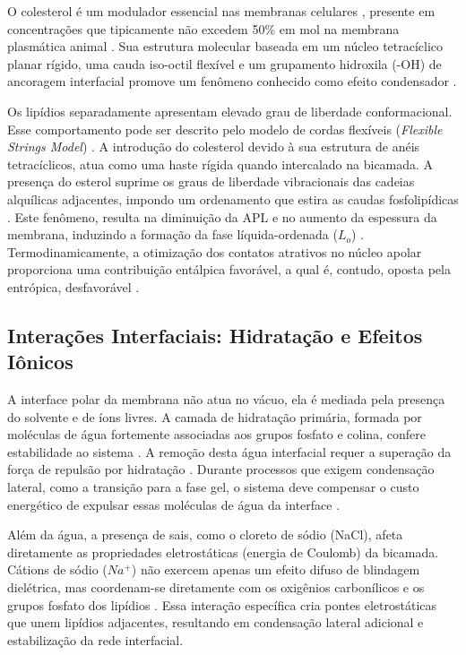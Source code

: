 O colesterol é um modulador essencial nas membranas celulares \cite{paukner2022}, presente em concentrações que tipicamente não excedem 50\% em mol na membrana plasmática animal \cite{khadka2021}. Sua estrutura molecular baseada em um núcleo tetracíclico planar rígido, uma cauda iso-octil flexível e um grupamento hidroxila (-OH) de ancoragem interfacial promove um fenômeno conhecido como efeito condensador \cite{sawdon2025}.

Os lipídios separadamente apresentam elevado grau de liberdade conformacional. Esse comportamento pode ser descrito pelo modelo de cordas flexíveis (\textit{Flexible Strings Model}) \cite{mukhin2016flexible}. A introdução do colesterol devido à sua estrutura de anéis tetracíclicos, atua como uma haste rígida quando intercalado na bicamada. A presença do esterol suprime os graus de liberdade vibracionais das cadeias alquílicas adjacentes, impondo um ordenamento que estira as caudas fosfolipídicas \cite{bennett2018}. Este fenômeno, resulta na diminuição da APL e no aumento da espessura da membrana, induzindo a formação da fase líquida-ordenada ($L_o$) \cite{leeb2018}. Termodinamicamente, a otimização dos contatos atrativos no núcleo apolar proporciona uma contribuição entálpica favorável, a qual é, contudo, oposta pela entrópica, desfavorável \cite{bennett2018}.

\subsection{Interações Interfaciais: Hidratação e Efeitos Iônicos}

A interface polar da membrana não atua no vácuo, ela é mediada pela presença do solvente e de íons livres. A camada de hidratação primária, formada por moléculas de água fortemente associadas aos grupos fosfato e colina, confere estabilidade ao sistema \cite{kowalik2015}. A remoção desta água interfacial requer a superação da força de repulsão por hidratação \cite{schneck2012}. Durante processos que exigem condensação lateral, como a transição para a fase gel, o sistema deve compensar o custo energético de expulsar essas moléculas de água da interface \cite{krok2024}.

Além da água, a presença de sais, como o cloreto de sódio (NaCl), afeta diretamente as propriedades eletrostáticas (energia de Coulomb) da bicamada. Cátions de sódio ($Na^+$) não exercem apenas um efeito difuso de blindagem dielétrica, mas coordenam-se diretamente com os oxigênios carbonílicos e os grupos fosfato dos lipídios \cite{bockmann2003, javanainen2017}. Essa interação específica cria pontes eletrostáticas que unem lipídios adjacentes, resultando em condensação lateral adicional e estabilização da rede interfacial. 


